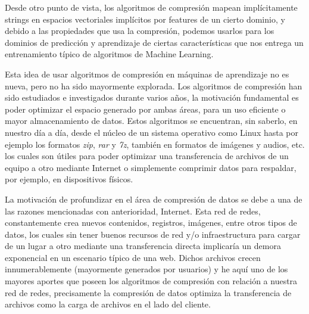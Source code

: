 




Desde otro punto de vista, los algoritmos de compresión mapean implícitamente strings en espacios vectoriales implícitos por features de un cierto dominio, y debido a las propiedades que usa la  compresión, podemos usarlos para los dominios de predicción y aprendizaje de ciertas características que nos entrega un entrenamiento típico de algoritmos de Machine Learning.

Esta idea de usar algoritmos de compresión en máquinas de aprendizaje no es nueva, pero no ha sido mayormente explorada. Los algoritmos de compresión han sido estudiados e investigados durante varios años, la motivación fundamental es poder optimizar el espacio generado por ambas áreas, para un uso eficiente o mayor almacenamiento de datos. Estos algoritmos se encuentran, sin saberlo, en nuestro día a día, desde el núcleo de un sistema operativo como Linux hasta por ejemplo los formatos \emph{zip}, \emph{rar} y \emph{7z}, también en formatos de imágenes y audios, etc. los cuales son útiles para poder optimizar una transferencia de archivos de un equipo a otro mediante Internet o simplemente comprimir datos para respaldar, por ejemplo, en dispositivos físicos. 

La motivación de profundizar en el área de compresión de datos se debe a una de las razones mencionadas con anterioridad, Internet. Esta red de redes, constantemente crea nuevos contenidos, registros, imágenes, entre otros tipos de datos,  los cuales sin tener buenos recursos de red y/o infraestructura para cargar de un lugar a otro mediante una transferencia directa implicaría un demora exponencial en un escenario típico de una web. Dichos archivos crecen innumerablemente (mayormente generados por usuarios) y he aquí uno de los mayores aportes que poseen los algoritmos de compresión con relación a nuestra red de redes, precisamente la compresión de datos optimiza la transferencia de archivos como la carga de archivos en el lado del cliente.

